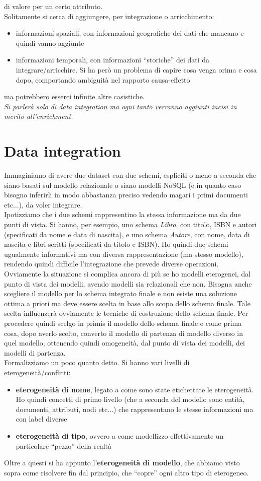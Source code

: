 \documentclass[a4paper,12pt, oneside]{book}
\begin{document}
di valore per un certo attributo.\\
Solitamente si cerca di aggiungere, per integrazione o arricchimento:
\begin{itemize}
  \item informazioni spaziali, con informazioni geografiche dei dati che mancano
  e quindi vanno aggiunte
  \item informazioni temporali, con informazioni ``storiche'' dei dati da
  integrare/arricchire. Si ha però un problema di capire cosa venga orima e cosa
  dopo, comportando ambiguità nel rapporto causa-effetto
\end{itemize}
ma potrebbero esserci infinite altre casistiche.\\
\textit{Si parlerà solo di data integration ma ogni tanto verranno aggiunti
  incisi in merito all'enrichment.}
\section{Data integration}
Immaginiamo di avere due dataset con due schemi, espliciti o meno a seconda che
siano basati sul modello relazionale o siano modelli NoSQL (e in quanto caso
bisogno inferirli in modo abbastanza preciso vedendo magari i primi documenti
etc$\ldots$), da voler integrare.\\
Ipotizziamo che i due schemi rappresentino la stessa informazione ma da due
punti di vista. Si hanno, per esempio, uno schema \textit{Libro}, con titolo,
ISBN e autori (specificati da nome e data di nascita), e uno schema
\textit{Autore}, con nome, data di nascita e libri scritti (specificati da
titolo e ISBN). Ho quindi due schemi ugualmente informativi ma con diversa
rappresentazione (ma stesso modello), rendendo quindi difficile l'integrazione
che prevede diverse operazioni. Ovviamente la situazione si complica ancora di
più se ho modelli eterogenei, dal punto di vista dei modelli, avendo modelli sia
relazionali che non. Bisogna anche scegliere 
il modello per lo schema integrato finale e non esiste una soluzione ottima a
priori ma deve essere scelta in base allo scopo dello schema finale. Tale scelta
influenzerà ovviamente le tecniche di costruzione dello schema finale. Per
procedere quindi scelgo in primis il modello dello schema finale e come prima
cosa, dopo averlo scelto, converto il modello di partenza di modello diverso in
quel modello, ottenendo quindi omogeneità, dal punto di vista dei modelli, dei
modelli di partenza.\\ 
Formalizziamo un poco quanto detto. Si hanno vari livelli di
eterogeneità/conflitti:
\begin{itemize}
  \item \textbf{eterogeneità di nome}, legato a come sono state etichettate le
  eterogeneità. Ho quindi concetti di primo livello (che a seconda del modello
  sono entità, documenti, attributi, nodi etc$\ldots$) che rappresentano le 
  stesse informazioni ma con label diverse
  \item \textbf{eterogeneità di tipo}, ovvero a come modellizzo effettivamente
  un particolare ``pezzo'' della realtà
\end{itemize}
Oltre a questi si ha appunto l'\textbf{eterogeneità di modello}, che abbiamo
visto sopra come risolvere fin dal principio, che ``copre'' ogni altro tipo di
eterogeneo.
\end{document}
